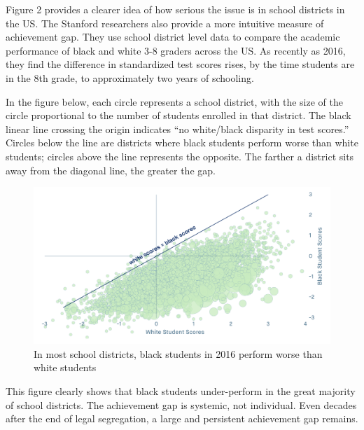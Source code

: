 \noindent Figure 2 provides a clearer idea of how serious the issue is in school districts in the US. The Stanford researchers also provide a more intuitive measure of achievement gap. They use school district level data to compare the academic performance of black and white 3-8 graders across the US. As recently as 2016, they find the difference in standardized test scores rises, by the time students are in the 8th grade, to approximately two years of schooling.

In the figure below, each circle represents a school district, with the size of the circle proportional to the number of students enrolled in that district. The black linear line crossing the origin indicates “no white/black disparity in test scores.” Circles below the line are districts where black students perform worse than white students; circles above the line represents the opposite. The farther a district sits away from the diagonal line, the greater the gap. 
 
\begin{figure}[H]
  \includegraphics[width=\linewidth]{f2.png}
  \caption{In most school districts, black students in 2016 perform worse than white students}
  \label{fig:boat1}
\end{figure}

This figure clearly shows that black students under-perform in the great majority of school districts. The achievement gap is systemic, not individual. Even decades after the end of legal segregation, a large and persistent achievement gap remains. 

